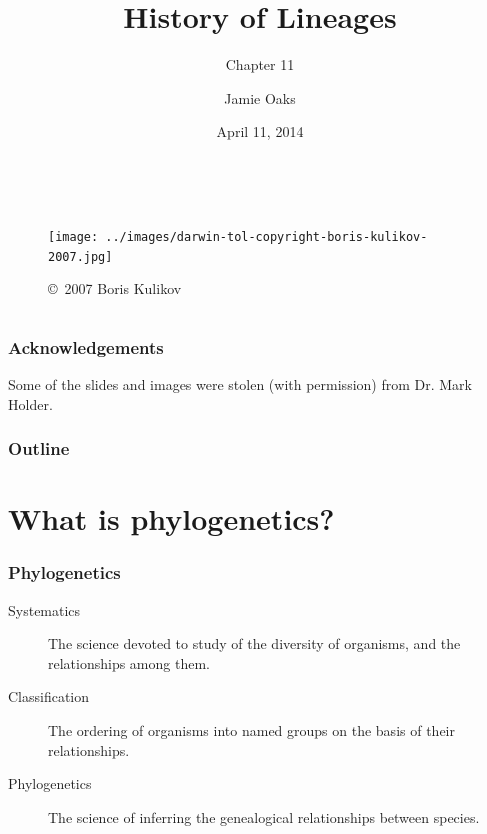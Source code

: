 



\title[History of Lineages]{History of Lineages}
\subtitle{Chapter 11}

\author[J.\ Oaks]{
    Jamie Oaks
}

\date{April 11, 2014}



\begin{frame}
    \begin{columns}[c]
            \maketitle
            \begin{figure}
                \begin{center}
                \texttt{[image: ../images/darwin-tol-copyright-boris-kulikov-2007.jpg]}
                \caption{\tiny \copyright~2007 Boris Kulikov}
                \end{center}
            \end{figure}
    \end{columns}
\end{frame}

\begin{frame}
    \frametitle{Acknowledgements}
    Some of the slides and images were stolen (with permission) from Dr. Mark Holder.
\end{frame}

\begin{frame}
\frametitle{Outline}
\tableofcontents
\end{frame}

\section{What is phylogenetics?}
\begin{frame}
    \frametitle{Phylogenetics}
    \begin{description}
        \item[Systematics] The science devoted to study of the diversity of
            organisms, and the relationships among them.
        \item[Classification] The ordering of organisms into named groups on
            the basis of their relationships.
        \item[Phylogenetics] The science of inferring the genealogical
            relationships between species.
    \end{description}
\end{frame}

